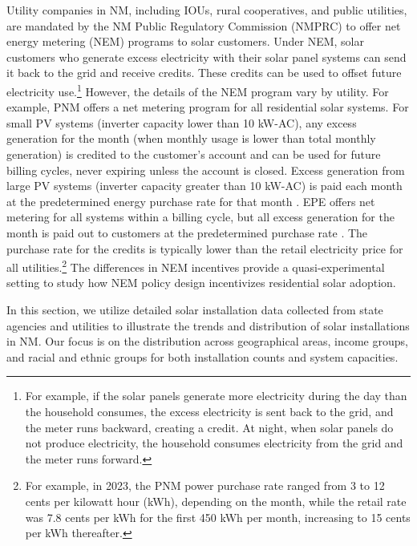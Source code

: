 \documentclass[11pt,twoside,letterpaper]{article}
\begin{document}
Utility companies in NM, including IOUs, rural cooperatives, and public utilities, are mandated by the NM Public Regulatory Commission (NMPRC) to offer net energy metering (NEM) programs to solar customers. Under NEM, solar customers who generate excess electricity with their solar panel systems can send it back to the grid and receive credits. These credits can be used to offset future electricity use.\footnote{For example, if the solar panels generate more electricity during the day than the household consumes, the excess electricity is sent back to the grid, and the meter runs backward, creating a credit. At night, when solar panels do not produce electricity, the household consumes electricity from the grid and the meter runs forward.} However, the details of the NEM program vary by utility. For example, PNM offers a net metering program for all residential solar systems. For small PV systems (inverter capacity lower than 10 kW-AC), any excess generation for the month (when monthly usage is lower than total monthly generation) is credited to the customer’s account and can be used for future billing cycles, never expiring unless the account is closed. Excess generation from large PV systems (inverter capacity greater than 10 kW-AC) is paid each month at the predetermined energy purchase rate for that month \parencite{pnmnet}. EPE offers net metering for all systems within a billing cycle, but all excess generation for the month is paid out to customers at the predetermined purchase rate \parencite{epenet, epenetmid}. The purchase rate for the credits is typically lower than the retail electricity price for all utilities.\footnote{For example, in 2023, the PNM power purchase rate ranged from 3 to 12 cents per kilowatt hour (kWh), depending on the month, while the retail rate was 7.8 cents per kWh for the first 450 kWh per month, increasing to 15 cents per kWh thereafter.} The differences in NEM incentives provide a quasi-experimental setting to study how NEM policy design incentivizes residential solar adoption. 


In this section, we utilize detailed solar installation data collected from state agencies and utilities to illustrate the trends and distribution of solar installations in NM. Our focus is on the distribution across geographical areas, income groups, and racial and ethnic groups for both installation counts and system capacities.
\end{document}

